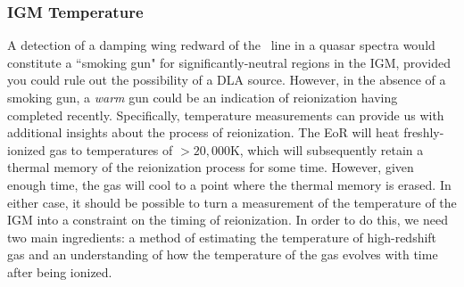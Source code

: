 


\subsubsection{IGM Temperature}\label{sec:IntroIGMTemperature}

A detection of a damping wing redward of the \lya\ line in a quasar spectra would constitute a ``smoking gun" for significantly-neutral regions in the IGM, provided you could rule out the possibility of a DLA source. However, in the absence of a smoking gun, a \textit{warm} gun could be an indication of reionization having completed recently. Specifically, temperature measurements can provide us with additional insights about the process of reionization. The EoR will heat freshly-ionized gas to temperatures of $>20,000$K, which will subsequently retain a thermal memory of the reionization process for some time. However, given enough time, the gas will cool to a point where the thermal memory is erased. In either case, it should be possible to turn a measurement of the temperature of the IGM into a constraint on the timing of reionization. In order to do this, we need two main ingredients: a method of estimating the temperature of high-redshift gas and an understanding of how the temperature of the gas evolves with time after being ionized. 


